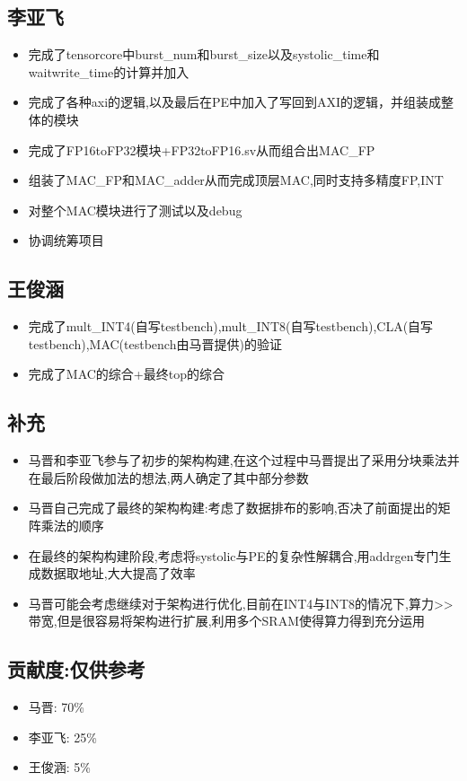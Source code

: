\documentclass[zihao=-4, UTF8]{ctexart}
\begin{document}
\subsection{李亚飞}
\begin{itemize}
    \item 完成了tensorcore中burst\_num和burst\_size以及systolic\_time和waitwrite\_time的计算并加入
    \item 完成了各种axi的逻辑,以及最后在PE中加入了写回到AXI的逻辑，并组装成整体的模块
    \item 完成了FP16toFP32模块+FP32toFP16.sv从而组合出MAC\_FP
    \item 组装了MAC\_FP和MAC\_adder从而完成顶层MAC,同时支持多精度FP,INT
    \item 对整个MAC模块进行了测试以及debug
    \item 协调统筹项目
\end{itemize}
\subsection{王俊涵}
\begin{itemize}
    \item 完成了mult\_INT4(自写testbench),mult\_INT8(自写testbench),CLA(自写testbench),MAC(testbench由马晋提供)的验证
    \item 完成了MAC的综合+最终top的综合
\end{itemize}
\subsection{补充}
\begin{itemize}
    \item 马晋和李亚飞参与了初步的架构构建,在这个过程中马晋提出了采用分块乘法并在最后阶段做加法的想法,两人确定了其中部分参数
    \item 马晋自己完成了最终的架构构建:考虑了数据排布的影响,否决了前面提出的矩阵乘法的顺序
    \item 在最终的架构构建阶段,考虑将systolic与PE的复杂性解耦合,用addrgen专门生成数据取地址,大大提高了效率
    \item 马晋可能会考虑继续对于架构进行优化,目前在INT4与INT8的情况下,算力>>带宽,但是很容易将架构进行扩展,利用多个SRAM使得算力得到充分运用
\end{itemize}
\subsection{贡献度:仅供参考}
\begin{itemize}
    \item 马晋: 70\%
    \item 李亚飞: 25\%
    \item 王俊涵: 5\%
\end{itemize}
\end{document}
